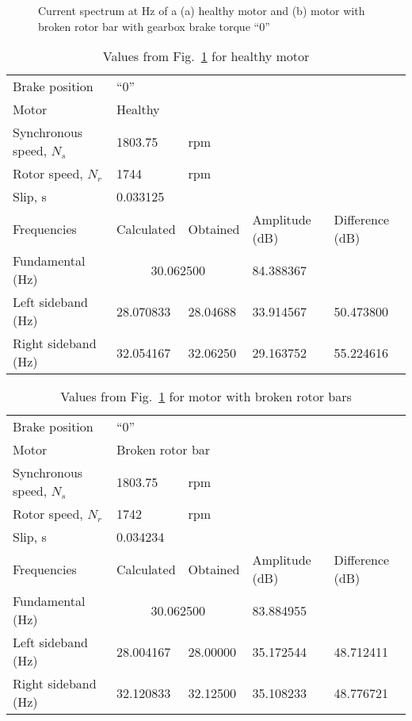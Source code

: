 \documentclass[a4paper,11pt]{report}
\begin{document}
\begin{figure}[h]
\centering
\subfigure[]{\texttt{[image: h030]}}
\subfigure[]{\texttt{[image: b030]}}
\caption{Current spectrum at \unit[30]{Hz} of a (a) healthy motor and (b) motor with broken rotor bar  with gearbox brake torque ``0''} \label{hb030ss}
\end{figure}

\begin{table}[h]
\centering
\begin{tabular}{lllll}
Brake position	& ``0'' & & & \\			
Motor &	\multicolumn{4}{l}{Healthy} \\ 
Synchronous speed, $N_{s}$	& 1803.75 & rpm & & \\			 
Rotor speed, $N_{r}$	& 1744	& rpm& & \\		
Slip, s	& \multicolumn{4}{l}{0.033125} \\			
Frequencies & Calculated & Obtained & Amplitude (dB) & Difference (dB) \\
Fundamental (Hz)& \multicolumn{2}{c}{30.062500}	& 84.388367 &  \\ 
Left sideband (Hz) & 28.070833 & 28.04688 & 33.914567 & 50.473800 \\
Right sideband (Hz)& 32.054167 & 32.06250 & 29.163752 & 55.224616 
\end{tabular}
\caption{Values from Fig.~\ref{hb030ss} for healthy motor} \label{h030sst}
\end{table}

\begin{table}[h]
\centering
\begin{tabular}{lllll}
Brake position	& ``0'' & & & \\			
Motor &	\multicolumn{4}{l}{Broken rotor	bar} \\ 
Synchronous speed, $N_{s}$	& 1803.75 & rpm & & \\			 
Rotor speed, $N_{r}$ & 1742	& rpm& & \\		
Slip, s	& \multicolumn{4}{l}{0.034234} \\			
Frequencies & Calculated & Obtained & Amplitude (dB) & Difference (dB) \\
Fundamental (Hz)& \multicolumn{2}{c}{30.062500}	&83.884955 &  \\ 
Left sideband (Hz) & 28.004167 &28.00000  & 35.172544 & 48.712411 \\
Right sideband (Hz)& 32.120833 & 32.12500 & 35.108233 & 48.776721 
\end{tabular}
\caption{Values from Fig.~\ref{hb030ss} for motor with broken rotor bars}\label{b030sst}
\end{table}
\end{document}
